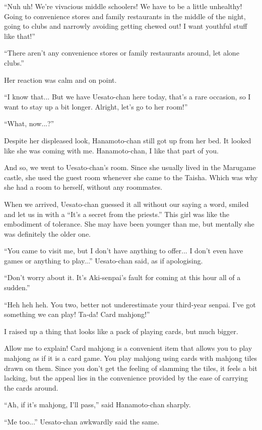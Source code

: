 ``Nuh uh! We're vivacious middle schoolers! We have to be a little unhealthy! Going to convenience stores and family restaurants in the middle of the night, going to clubs and narrowly avoiding getting chewed out! I want youthful stuff like that!''

``There aren't any convenience stores or family restaurants around, let alone clubs.''

Her reaction was calm and on point.

``I know that... But we have Uesato-chan here today, that's a rare occasion, so I want to stay up a bit longer. Alright, let's go to her room!''

``What, now...?''

Despite her displeased look, Hanamoto-chan still got up from her bed. It looked like she was coming with me. Hanamoto-chan, I like that part of you.

And so, we went to Uesato-chan's room. Since she usually lived in the Marugame castle, she used the guest room whenever she came to the Taisha. Which was why she had a room to herself, without any roommates.

When we arrived, Uesato-chan guessed it all without our saying a word, smiled and let us in with a ``It's a secret from the priests.'' This girl was like the embodiment of tolerance. She may have been younger than me, but mentally she was definitely the older one.

``You came to visit me, but I don't have anything to offer... I don't even have games or anything to play...'' Uesato-chan said, as if apologising.

``Don't worry about it. It's Aki-senpai's fault for coming at this hour all of a sudden.''

``Heh heh heh. You two, better not underestimate your third-year senpai. I've got something we can play! Ta-da! Card mahjong!''

I raised up a thing that looks like a pack of playing cards, but much bigger.

Allow me to explain! Card mahjong is a convenient item that allows you to play mahjong as if it is a card game. You play mahjong using cards with mahjong tiles drawn on them. Since you don't get the feeling of slamming the tiles, it feels a bit lacking, but the appeal lies in the convenience provided by the ease of carrying the cards around.

``Ah, if it's mahjong, I'll pass,'' said Hanamoto-chan sharply.

``Me too...'' Uesato-chan awkwardly said the same.


